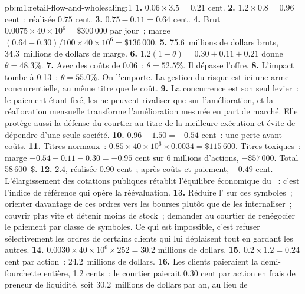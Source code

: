 \begin{solution}{pb:m1:retail-flow-and-wholesaling:1}
\textbf{1.} $0.06 \times 3.5 = 0.21$ cent.
\textbf{2.}  $1.2 \times 0.8 = 0.96$ cent~; réalisée $0.75$ cent.
\textbf{3.} $0.75 - 0.11 = 0.64$ cent.
\textbf{4.} Brut $0.0075 \times 40\times10^6 = \$300\,000$ par jour~; marge
$(0.64 - 0.30)/100 \times 40\times10^6 = \$136\,000$.
\textbf{5.} 75.6~millions de dollars bruts, 34.3~millions de dollars de marge.
\textbf{6.} $1.2(1-\theta) = 0.30 + 0.11 + 0.21$ donne $\theta = 48.3\%$.
\textbf{7.} Avec des coûts de 0.06~: $\theta = 52.5\%$. Il dépasse l'offre.
\textbf{8.} L'impact tombe à 0.13~: $\theta = 55.0\%$. On l'emporte. La gestion du
risque est ici une arme concurrentielle, au même titre que le coût.
\textbf{9.} La concurrence est son seul levier~: le paiement étant fixé, les
 ne peuvent rivaliser que sur l'amélioration, et la réallocation mensuelle
transforme l'amélioration mesurée en part de marché. Elle protège aussi la défense du
courtier au titre de la meilleure exécution et évite de dépendre d'une seule société.
\textbf{10.} $0.96 - 1.50 = -0.54$ cent~: une perte avant coûts.
\textbf{11.} Titres normaux~: $0.85 \times 40\times10^6 \times 0.0034 =
\$115\,600$. Titres toxiques~: marge $-0.54 - 0.11 - 0.30 = -0.95$ cent sur 6
millions d'actions, $-\$57\,000$. Total 58\,600~\$.
\textbf{12.}  $2.4$, réalisée $0.90$ cent~; après coûts et paiement,
$+0.49$ cent. L'élargissement des cotations publiques rétablit l'équilibre économique
du ~: c'est l'indice de référence qui opère la réévaluation.
\textbf{13.} Réduire l' sur ces symboles~; orienter davantage de ces ordres
vers les bourses plutôt que de les internaliser~; couvrir plus vite et détenir moins de stock~;
demander au courtier de renégocier le paiement par classe de symboles. Ce qui est impossible, c'est
refuser sélectivement les ordres de certains clients qui lui déplaisent tout en gardant les autres.
\textbf{14.} $0.0030 \times 40\times10^6 \times 252 = 30.2$ millions de dollars.
\textbf{15.} $0.2 \times 1.2 = 0.24$ cent par action~: 24.2~millions de dollars.
\textbf{16.} Les clients paieraient la demi-fourchette entière, 1.2 cents~; le courtier
paierait 0.30 cent par action en frais de preneur de liquidité, soit 30.2~millions de dollars par an, au lieu de

\end{solution}
